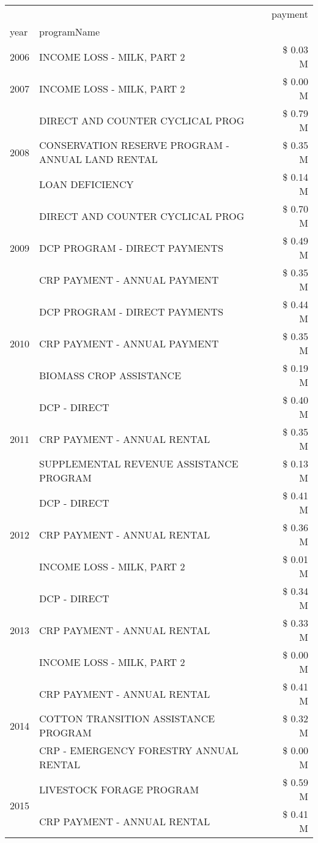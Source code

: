 \begin{tabular}{llr}
\toprule
 &  & payment \\
year & programName &  \\
\midrule
2006 & INCOME LOSS - MILK, PART 2 & \$ 0.03 M \\
\cline{1-3}
2007 & INCOME LOSS - MILK, PART 2 & \$ 0.00 M \\
\cline{1-3}
\multirow[t]{3}{*}{2008} & DIRECT AND COUNTER CYCLICAL PROG & \$ 0.79 M \\
 & CONSERVATION RESERVE PROGRAM - ANNUAL LAND RENTAL & \$ 0.35 M \\
 & LOAN DEFICIENCY & \$ 0.14 M \\
\cline{1-3}
\multirow[t]{3}{*}{2009} & DIRECT AND COUNTER CYCLICAL PROG & \$ 0.70 M \\
 & DCP PROGRAM - DIRECT PAYMENTS & \$ 0.49 M \\
 & CRP PAYMENT - ANNUAL PAYMENT & \$ 0.35 M \\
\cline{1-3}
\multirow[t]{3}{*}{2010} & DCP PROGRAM - DIRECT PAYMENTS & \$ 0.44 M \\
 & CRP PAYMENT - ANNUAL PAYMENT & \$ 0.35 M \\
 & BIOMASS CROP ASSISTANCE & \$ 0.19 M \\
\cline{1-3}
\multirow[t]{3}{*}{2011} & DCP - DIRECT & \$ 0.40 M \\
 & CRP PAYMENT - ANNUAL RENTAL & \$ 0.35 M \\
 & SUPPLEMENTAL REVENUE ASSISTANCE PROGRAM & \$ 0.13 M \\
\cline{1-3}
\multirow[t]{3}{*}{2012} & DCP - DIRECT & \$ 0.41 M \\
 & CRP PAYMENT - ANNUAL RENTAL & \$ 0.36 M \\
 & INCOME LOSS - MILK, PART 2 & \$ 0.01 M \\
\cline{1-3}
\multirow[t]{3}{*}{2013} & DCP - DIRECT & \$ 0.34 M \\
 & CRP PAYMENT - ANNUAL RENTAL & \$ 0.33 M \\
 & INCOME LOSS - MILK, PART 2 & \$ 0.00 M \\
\cline{1-3}
\multirow[t]{3}{*}{2014} & CRP PAYMENT - ANNUAL RENTAL & \$ 0.41 M \\
 & COTTON TRANSITION ASSISTANCE PROGRAM & \$ 0.32 M \\
 & CRP - EMERGENCY FORESTRY ANNUAL RENTAL & \$ 0.00 M \\
\cline{1-3}
\multirow[t]{3}{*}{2015} & LIVESTOCK FORAGE PROGRAM & \$ 0.59 M \\
 & CRP PAYMENT - ANNUAL RENTAL & \$ 0.41 M \\

\end{tabular}
